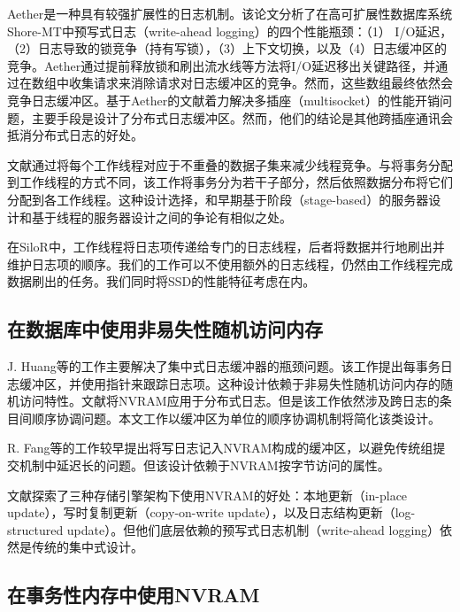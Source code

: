 Aether\cite{Johnson:2010:ASA:1920841.1920928}是一种具有较强扩展性的日志机制。该论文分析了在高可扩展性数据库系统Shore-MT中预写式日志（write-ahead logging）的四个性能瓶颈：（1） I/O延迟，（2）日志导致的锁竞争（持有写锁），（3）上下文切换，以及（4）日志缓冲区的竞争。Aether通过提前释放锁和刷出流水线等方法将I/O延迟移出关键路径，并通过在数组中收集请求来消除请求对日志缓冲区的竞争。然而，这些数组最终依然会竞争日志缓冲区。基于Aether的文献\cite{raey}着力解决多插座（multisocket）的性能开销问题，主要手段是设计了分布式日志缓冲区。然而，他们的结论是其他跨插座通讯会抵消分布式日志的好处。

文献\cite{Pandis:2010:DTE:1920841.1920959}通过将每个工作线程对应于不重叠的数据子集来减少线程竞争。与将事务分配到工作线程的方式不同，该工作将事务分为若干子部分，然后依照数据分布将它们分配到各工作线程。这种设计选择，和早期基于阶段（stage-based）的服务器设计\cite{Welsh:2001:SAW:502034.502057}和基于线程的服务器设计\cite{vonBehren:2003:CST:945445.945471}之间的争论有相似之处。

在SiloR\cite{Zheng:2014:FDF:2685048.2685085}中，工作线程将日志项传递给专门的日志线程，后者将数据并行地刷出并维护日志项的顺序。我们的工作可以不使用额外的日志线程，仍然由工作线程完成数据刷出的任务。我们同时将SSD的性能特征考虑在内。

\subsection{在数据库中使用非易失性随机访问内存}

J. Huang等的工作\cite{Huang:2014:NLT:2735496.2735502}主要解决了集中式日志缓冲器的瓶颈问题。该工作提出每事务日志缓冲区，并使用指针来跟踪日志项。这种设计依赖于非易失性随机访问内存的随机访问特性。文献\cite{Wang:2014:SLT:2732951.2732960}将NVRAM应用于分布式日志。但是该工作依然涉及跨日志的条目间顺序协调问题。本文工作以缓冲区为单位的顺序协调机制将简化该类设计。

R. Fang等的工作\cite{5767918}较早提出将写日志记入NVRAM构成的缓冲区，以避免传统组提交机制中延迟长的问题。但该设计依赖于NVRAM按字节访问的属性。

文献\cite{Arulraj:2015:LTS:2723372.2749441}探索了三种存储引擎架构下使用NVRAM的好处：本地更新（in-place update），写时复制更新（copy-on-write update），以及日志结构更新（log-structured update）。但他们底层依赖的预写式日志机制（write-ahead logging）依然是传统的集中式设计。

\subsection{在事务性内存中使用NVRAM}

